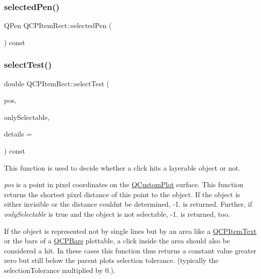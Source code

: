 \mbox{\label{class_q_c_p_item_rect_abd93cf93404ce827dfae71d9d9d08b29}} 
\subsubsection{\texorpdfstring{selectedPen()}{selectedPen()}}
{\footnotesize\ttfamily Q\+Pen Q\+C\+P\+Item\+Rect\+::selected\+Pen (\begin{DoxyParamCaption}{ }\end{DoxyParamCaption}) const\hspace{0.3cm}{\ttfamily [inline]}}

\mbox{\label{class_q_c_p_item_rect_a2e68621b75bae4da6ae0ab2cdd0dd733}} 
\subsubsection{\texorpdfstring{selectTest()}{selectTest()}}
{\footnotesize\ttfamily double Q\+C\+P\+Item\+Rect\+::select\+Test (\begin{DoxyParamCaption}\item[{const Q\+PointF \&}]{pos,  }\item[{bool}]{only\+Selectable,  }\item[{Q\+Variant $\ast$}]{details = {} }\end{DoxyParamCaption}) const\hspace{0.3cm}{\ttfamily [virtual]}}

This function is used to decide whether a click hits a layerable object or not.

{\itshape pos} is a point in pixel coordinates on the \mbox{\hyperlink{class_q_custom_plot}{Q\+Custom\+Plot}} surface. This function returns the shortest pixel distance of this point to the object. If the object is either invisible or the distance couldn\textquotesingle{}t be determined, -\/1. is returned. Further, if {\itshape only\+Selectable} is true and the object is not selectable, -\/1. is returned, too.

If the object is represented not by single lines but by an area like a \mbox{\hyperlink{class_q_c_p_item_text}{Q\+C\+P\+Item\+Text}} or the bars of a \mbox{\hyperlink{class_q_c_p_bars}{Q\+C\+P\+Bars}} plottable, a click inside the area should also be considered a hit. In these cases this function thus returns a constant value greater zero but still below the parent plot\textquotesingle{}s selection tolerance. (typically the selection\+Tolerance multiplied by 0.).

